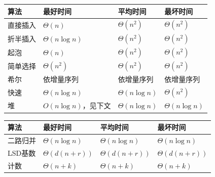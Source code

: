 \begin{wideblock}

\par\medskip\noindent\begin{minipage}{\linewidth}\fontsize{9.3}{12}\selectfont\begin{tabularx}{\linewidth}{@{}YYYY@{}}
\toprule\noalign{}
算法 & 最好时间 & 平均时间 & 最坏时间 \\
\midrule\noalign{}


直接插入 & \(\Theta(n)\) & \(\Theta(n^2)\) & \(\Theta(n^2)\) \\
折半插入 & \(\Theta(n\log n)\) & \(\Theta(n^2)\) & \(\Theta(n^2)\) \\
起泡 & \(\Theta(n)\) & \(\Theta(n^2)\) & \(\Theta(n^2)\) \\
简单选择 & \(\Theta(n^2)\) & \(\Theta(n^2)\) & \(\Theta(n^2)\) \\
希尔 & 依增量序列 & 依增量序列 & 依增量序列 \\
快速 & \(\Theta(n\log n)\) & \(\Theta(n\log n)\) & \(\Theta(n^2)\) \\
堆 & \(O(n\log n)\)，见下文 & \(\Theta(n\log n)\) & \(\Theta(n\log n)\) \\
\bottomrule\end{tabularx}
\end{minipage}\par\medskip

\par\medskip\noindent\begin{minipage}{\linewidth}\fontsize{9.3}{12}\selectfont\begin{tabularx}{\linewidth}{@{}YYYY@{}}
\toprule\noalign{}
算法 & 最好时间 & 平均时间 & 最坏时间 \\
\midrule\noalign{}


二路归并 & \(\Theta(n\log n)\) & \(\Theta(n\log n)\) & \(\Theta(n\log n)\) \\
LSD基数 & \(\Theta(d(n+r))\) & \(\Theta(d(n+r))\) & \(\Theta(d(n+r))\) \\
计数 & \(\Theta(n+k)\) & \(\Theta(n+k)\) & \(\Theta(n+k)\) \\
\bottomrule\end{tabularx}
\end{minipage}\par\medskip

\end{wideblock}

